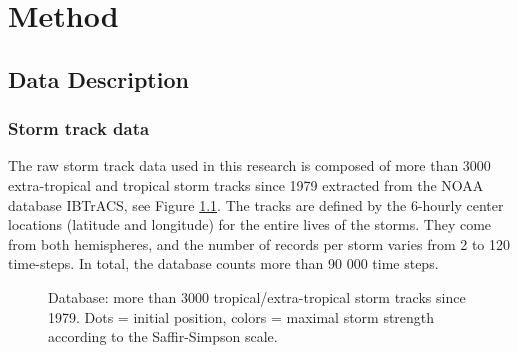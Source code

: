 

\chapter{Method}
\section{Data Description}
\subsection{Storm track data}
The raw storm track data used in this research is composed of more than 3000 extra-tropical and tropical storm tracks since 1979 extracted from the NOAA database IBTrACS\cite{knapp2010international}, see Figure \ref{fig:storm_tracks}. The tracks are defined by the 6-hourly center locations (latitude and longitude) for the entire lives of the storms. They come from both hemispheres, and the number of records per storm varies from 2 to 120 time-steps. In total, the database counts more than 90 000 time steps. 
\begin{figure}
	\begin{center}
		\hsize {}
	\end{center}
	\caption{Database: more than 3000 tropical/extra-tropical storm
		tracks since 1979. Dots = initial position, colors = maximal storm strength according to the Saffir-Simpson scale.}
	\label{fig:storm_tracks}
\end{figure}
